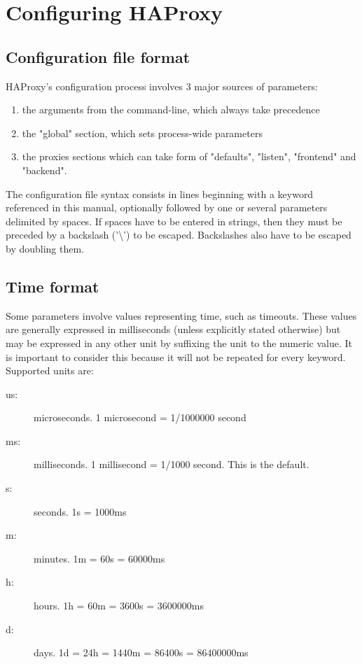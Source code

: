 \chapter{Configuring HAProxy}
\section{Configuration file format}
HAProxy's configuration process involves 3 major sources of parameters:

\begin{enumerate}
  \item the arguments from the command-line, which always take precedence
  \item the "global" section, which sets process-wide parameters
  \item the proxies sections which can take form of "defaults", "listen",
    "frontend" and "backend".
\end{enumerate}

The configuration file syntax consists in lines beginning with a keyword
referenced in this manual, optionally followed by one or several parameters
delimited by spaces. If spaces have to be entered in strings, then they must be
preceded by a backslash ('\textbackslash') to be escaped. Backslashes also have to be
escaped by doubling them.

\section{Time format}
Some parameters involve values representing time, such as timeouts. These
values are generally expressed in milliseconds (unless explicitly stated
otherwise) but may be expressed in any other unit by suffixing the unit to the
numeric value. It is important to consider this because it will not be repeated
for every keyword. Supported units are:

\begin{description}
  \item[us:] microseconds. 1 microsecond = 1/1000000 second
  \item[ms:] milliseconds. 1 millisecond = 1/1000 second. This is the default.
  \item[s:]  seconds. 1s = 1000ms
  \item[m:]  minutes. 1m = 60s = 60000ms
  \item[h:]  hours.   1h = 60m = 3600s = 3600000ms
  \item[d:]  days.    1d = 24h = 1440m = 86400s = 86400000ms
\end{description}

